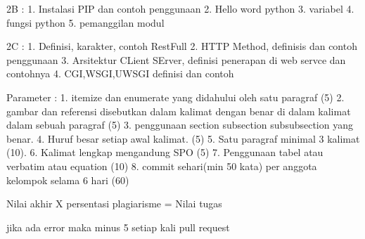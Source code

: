 2B :
1. Instalasi PIP dan contoh penggunaan
2. Hello word python
3. variabel
4. fungsi python
5. pemanggilan modul

2C :
1. Definisi, karakter, contoh RestFull
2. HTTP Method, definisis dan contoh penggunaan
3. Arsitektur CLient SErver, definisi penerapan di web servce dan contohnya
4. CGI,WSGI,UWSGI definisi dan contoh



Parameter :
1. itemize dan enumerate yang didahului oleh satu paragraf (5)
2. gambar dan referensi disebutkan dalam kalimat dengan benar di dalam kalimat dalam sebuah paragraf (5)
3. penggunaan section subsection subsubsection yang benar. 
4. Huruf besar setiap awal kalimat. (5)
5. Satu paragraf minimal 3 kalimat (10).
6. Kalimat lengkap mengandung SPO (5)
7. Penggunaan tabel atau verbatim atau equation (10)
8. commit sehari(min 50 kata) per anggota kelompok selama 6 hari (60)

Nilai akhir X persentasi plagiarisme = Nilai tugas


jika ada error maka minus 5 setiap kali pull request